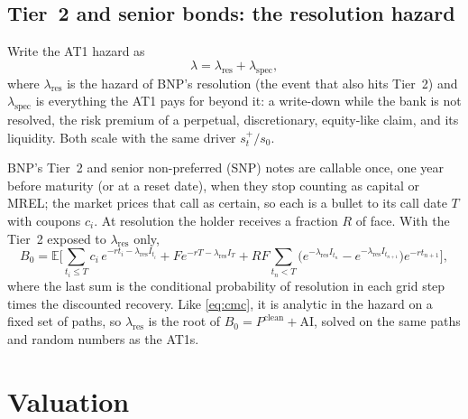 \documentclass[11pt]{article}
\newcommand{\E}{\mathbb{E}}
\newcommand{\1}{\mathbf{1}}
\begin{document}
\subsection{Tier~2 and senior bonds: the resolution hazard}\label{sec:t2model}
Write the AT1 hazard as
\begin{equation}\label{eq:split}
  \lambda = \lambda_{\mathrm{res}} + \lambda_{\mathrm{spec}},
\end{equation}
where $\lambda_{\mathrm{res}}$ is the hazard of BNP's resolution (the event that
also hits Tier~2) and $\lambda_{\mathrm{spec}}$ is everything the AT1 pays for
beyond it: a write-down while the bank is not resolved, the risk premium of a
perpetual, discretionary, equity-like claim, and its liquidity. Both scale with
the same driver $s_t^+/s_0$.

BNP's Tier~2 and senior non-preferred (SNP) notes are callable once, one year
before maturity (or at a reset date), when they stop counting as capital or
MREL; the market prices that call as certain, so each is a bullet to its call
date $T$ with coupons $c_i$. At resolution the holder receives a fraction $R$ of
face. With the Tier~2 exposed to $\lambda_{\mathrm{res}}$ only,
\begin{equation}\label{eq:t2price}
  B_0=\E\Biggl[\sum_{t_i\le T} c_i\,e^{-rt_i-\lambda_{\mathrm{res}}I_{t_i}}
  + F e^{-rT-\lambda_{\mathrm{res}}I_T}
  + R F\sum_{t_n<T}\bigl(e^{-\lambda_{\mathrm{res}}I_{t_n}}-e^{-\lambda_{\mathrm{res}}I_{t_{n+1}}}\bigr)e^{-rt_{n+1}}\Biggr],
\end{equation}
where the last sum is the conditional probability of resolution in each grid
step times the discounted recovery. Like \eqref{eq:cmc}, it is analytic in the
hazard on a fixed set of paths, so $\lambda_{\mathrm{res}}$ is the root of
$B_0=P^{\mathrm{clean}}+\mathrm{AI}$, solved on the same paths and random
numbers as the AT1s.

\section{Valuation}
\end{document}
